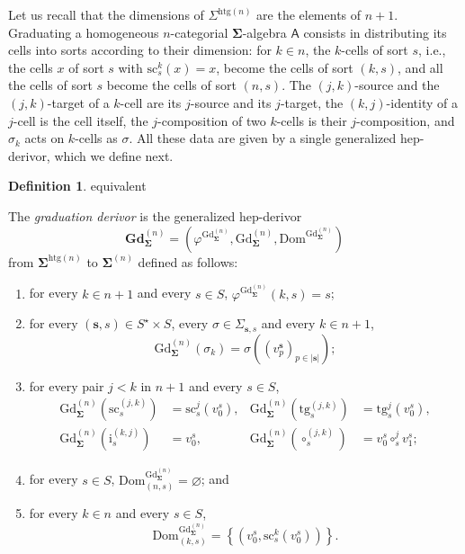 \documentclass[a4paper, reqno]{amsbook}
\makeatletter
\newcommand{\bb}[1]{\ensuremath{\lvert #1 \rvert}}
\newcommand{\sig}[1]{\mathbf{#1}}             %
\newcommand{\calg}[1]{\boldsymbol{\mathsf{#1}}} %
\newcommand{\Dom}{\mathrm{Dom}}
\newcommand{\htg}{\mathrm{htg}}                %
\newcommand{\src}{\mathrm{sc}}
\newcommand{\tgt}{\mathrm{tg}}
\newcommand{\Gd}{\mathrm{Gd}}
\newcommand{\bGd}{\mathbf{Gd}}
\theoremstyle{plain}
\theoremstyle{definition}
\newtheorem{definition}[theorem]{Definition}
\newcommand*{\CA@leanpending}{}
\newcommand*{\CA@leanrelation}{}
\newcommand*{\lean}[2]{%
  \ifcsname\string\color@lean@#1\endcsname\else
    \PackageError{main}{Unknown relation `#1' in \string\lean}{Use equivalent, weaker or stronger.}%
  \fi
  \gdef\CA@leanrelation{#1}%
  \gdef\CA@leanpending{#2}}
\makeatother
\begin{document}
Let us recall that the dimensions of $\Sigma^{\htg(n)}$ are the elements of $n+1$.
Graduating a homogeneous $n$-categorial $\sig{\Sigma}$-algebra $\calg{A}$ consists in distributing its cells into sorts according to their dimension: for $k\in n$, the $k$-cells of sort $s$, i.e., the cells $x$ of sort $s$ with $\src^{k}_{s}(x)=x$, become the cells of sort $(k,s)$, and all the cells of sort $s$ become the cells of sort $(n,s)$.
The $(j,k)$-source and the $(j,k)$-target of a $k$-cell are its $j$-source and its $j$-target, the $(k,j)$-identity of a $j$-cell is the cell itself, the $j$-composition of two $k$-cells is their $j$-composition, and $\sigma_{k}$ acts on $k$-cells as $\sigma$.
All these data are given by a single generalized hep-derivor, which we define next.

\begin{definition}\label{DGdDerivor}\lean{equivalent}{Presentations.graduation}
The \emph{graduation derivor} is the generalized hep-derivor
$$
\bGd^{(n)}_{\sig{\Sigma}}=\left(\varphi^{\Gd^{(n)}_{\sig{\Sigma}}},\Gd^{(n)}_{\sig{\Sigma}},\Dom^{\Gd^{(n)}_{\sig{\Sigma}}}\right)
$$
from $\sig{\Sigma}^{\htg(n)}$ to $\sig{\Sigma}^{(n)}$ defined as follows:
\begin{enumerate}
\item for every $k\in n+1$ and every $s\in S$, $\varphi^{\Gd^{(n)}_{\sig{\Sigma}}}(k,s)=s$;
\item for every $(\mathbf{s},s)\in S^{\star}\times S$, every $\sigma\in\Sigma_{\mathbf{s},s}$ and every $k\in n+1$,
$$
\Gd^{(n)}_{\sig{\Sigma}}(\sigma_{k})=\sigma((v^{\mathbf{s}}_{p})_{p\in\bb{\mathbf{s}}});
$$
\item for every pair $j<k$ in $n+1$ and every $s\in S$,
\begin{align*}
\Gd^{(n)}_{\sig{\Sigma}}(\src^{(j,k)}_{s})&=\src^{j}_{s}(v^{s}_{0}), &
\Gd^{(n)}_{\sig{\Sigma}}(\tgt^{(j,k)}_{s})&=\tgt^{j}_{s}(v^{s}_{0}),\\
\Gd^{(n)}_{\sig{\Sigma}}(\mathrm{i}^{(k,j)}_{s})&=v^{s}_{0}, &
\Gd^{(n)}_{\sig{\Sigma}}(\circ^{(j,k)}_{s})&=v^{s}_{0}\circ^{j}_{s}v^{s}_{1};
\end{align*}
\item for every $s\in S$, $\Dom^{\Gd^{(n)}_{\sig{\Sigma}}}_{(n,s)}=\varnothing$; and
\item for every $k\in n$ and every $s\in S$,
$$
\Dom^{\Gd^{(n)}_{\sig{\Sigma}}}_{(k,s)}=\left\lbrace\left(v^{s}_{0},\src^{k}_{s}(v^{s}_{0})\right)\right\rbrace.
$$
\end{enumerate}
\end{definition}
\end{document}
